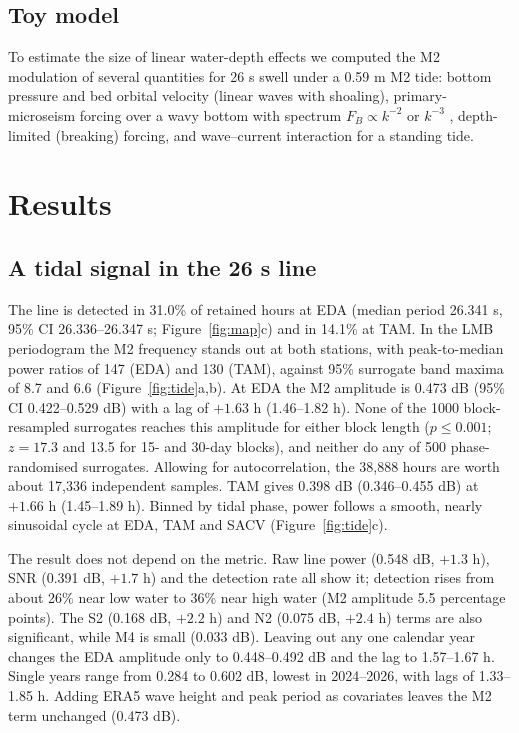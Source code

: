 \documentclass[11pt]{article}
\begin{document}
\subsection{Toy model}
To estimate the size of linear water-depth effects we computed the M2 modulation of several quantities for 26 s swell under a 0.59 m M2 tide: bottom pressure and bed orbital velocity (linear waves with shoaling), primary-microseism forcing over a wavy bottom with spectrum $F_B\propto k^{-2}$ or $k^{-3}$ \citep{hasselmann1963,ardhuin2018}, depth-limited (breaking) forcing, and wave--current interaction for a standing tide.

\section{Results}
\subsection{A tidal signal in the 26 s line}
The line is detected in 31.0\% of retained hours at EDA (median period 26.341 s, 95\% CI 26.336--26.347 s; Figure~\ref{fig:map}c) and in 14.1\% at TAM. In the LMB periodogram the M2 frequency stands out at both stations, with peak-to-median power ratios of 147 (EDA) and 130 (TAM), against 95\% surrogate band maxima of 8.7 and 6.6 (Figure~\ref{fig:tide}a,b). At EDA the M2 amplitude is 0.473 dB (95\% CI 0.422--0.529 dB) with a lag of $+1.63$ h (1.46--1.82 h). None of the 1000 block-resampled surrogates reaches this amplitude for either block length ($p\le0.001$; $z=17.3$ and 13.5 for 15- and 30-day blocks), and neither do any of 500 phase-randomised surrogates. Allowing for autocorrelation, the 38,888 hours are worth about 17,336 independent samples. TAM gives 0.398 dB (0.346--0.455 dB) at $+1.66$ h (1.45--1.89 h). Binned by tidal phase, power follows a smooth, nearly sinusoidal cycle at EDA, TAM and SACV (Figure~\ref{fig:tide}c).

The result does not depend on the metric. Raw line power (0.548 dB, $+1.3$ h), SNR (0.391 dB, $+1.7$ h) and the detection rate all show it; detection rises from about 26\% near low water to 36\% near high water (M2 amplitude 5.5 percentage points). The S2 (0.168 dB, $+2.2$ h) and N2 (0.075 dB, $+2.4$ h) terms are also significant, while M4 is small (0.033 dB). Leaving out any one calendar year changes the EDA amplitude only to 0.448--0.492 dB and the lag to 1.57--1.67 h. Single years range from 0.284 to 0.602 dB, lowest in 2024--2026, with lags of 1.33--1.85 h. Adding ERA5 wave height and peak period \citep{hersbach2020} as covariates leaves the M2 term unchanged (0.473 dB).
\end{document}
